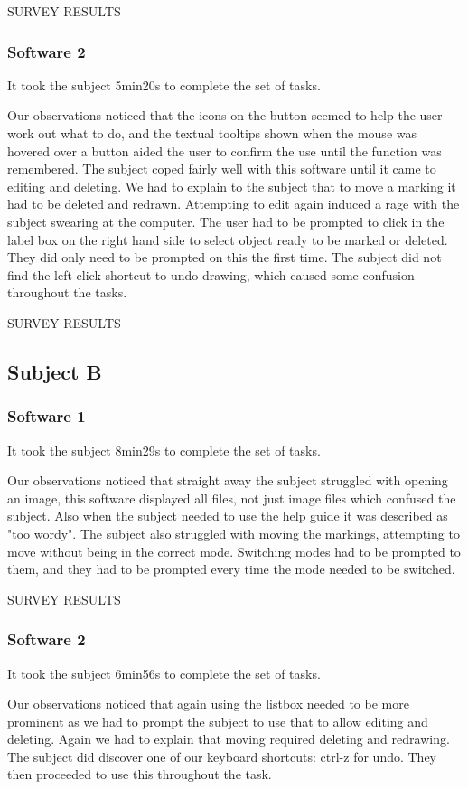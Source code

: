 \documentclass[a4paper,11pt,oneside]{article}
\begin{document}
SURVEY RESULTS

\subsubsection{Software 2}
It took the subject 5min20s to complete the set of tasks.

Our observations noticed that the icons on the button seemed to help the user work out what to do, and the textual tooltips shown when the mouse was hovered over a button aided the user to confirm the use until the function was remembered.  The subject coped fairly well with this software until it came to editing and deleting.  We had to explain to the subject that to move a marking it had to be deleted and redrawn.  Attempting to edit again induced a rage with the subject swearing at the computer.  The user had to be prompted to click in the label box on the right hand side to select object ready to be marked or deleted.  They did only need to be prompted on this the first time. The subject did not find the left-click shortcut to undo drawing, which caused some confusion throughout the tasks.

SURVEY RESULTS

\subsection{Subject B}
\subsubsection{Software 1}
It took the subject 8min29s to complete the set of tasks.

Our observations noticed that straight away the subject struggled with opening an image, this software displayed all files, not just image files which confused the subject.  Also when the subject needed to use the help guide it was described as "too wordy".  The subject also struggled with moving the markings, attempting to move without being in the correct mode.  Switching modes had to be prompted to them, and they had to be prompted every time the mode needed to be switched.

SURVEY RESULTS

\subsubsection{Software 2}
It took the subject 6min56s to complete the set of tasks.

Our observations noticed that again using the listbox needed to be more prominent as we had to prompt the subject to use that to allow editing and deleting.  Again we had to explain that moving required deleting and redrawing.  The subject did discover one of our keyboard shortcuts: ctrl-z for undo.  They then proceeded to use this throughout the task.
\end{document}
